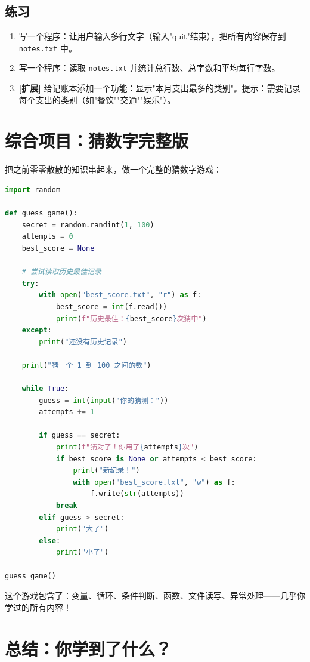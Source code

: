 \documentclass[a4paper,12pt]{ctexart}
\begin{document}
\subsection*{练习}

\begin{enumerate}
  \item 写一个程序：让用户输入多行文字（输入"quit"结束），把所有内容保存到 \texttt{notes.txt} 中。
  \item 写一个程序：读取 \texttt{notes.txt} 并统计总行数、总字数和平均每行字数。
  \item \textbf{[扩展]} 给记账本添加一个功能：显示"本月支出最多的类别"。提示：需要记录每个支出的类别（如"餐饮""交通""娱乐"）。
\end{enumerate}

\section*{综合项目：猜数字完整版}

把之前零零散散的知识串起来，做一个完整的猜数字游戏：

\begin{lstlisting}[language=Python]
import random

def guess_game():
    secret = random.randint(1, 100)
    attempts = 0
    best_score = None
    
    # 尝试读取历史最佳记录
    try:
        with open("best_score.txt", "r") as f:
            best_score = int(f.read())
            print(f"历史最佳：{best_score}次猜中")
    except:
        print("还没有历史记录")
    
    print("猜一个 1 到 100 之间的数")
    
    while True:
        guess = int(input("你的猜测："))
        attempts += 1
        
        if guess == secret:
            print(f"猜对了！你用了{attempts}次")
            if best_score is None or attempts < best_score:
                print("新纪录！")
                with open("best_score.txt", "w") as f:
                    f.write(str(attempts))
            break
        elif guess > secret:
            print("大了")
        else:
            print("小了")

guess_game()
\end{lstlisting}

这个游戏包含了：变量、循环、条件判断、函数、文件读写、异常处理——几乎你学过的所有内容！

\section*{总结：你学到了什么？}
\end{document}
